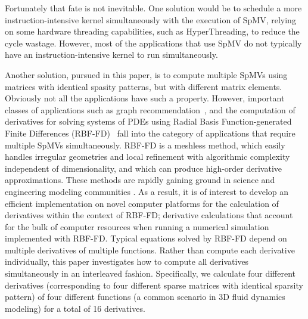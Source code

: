 \documentclass{sig-alternate}
\def\ge#1{{#1}}
\def\NOTE#1{{}}
\begin{document}
Fortunately that fate is not inevitable. One solution would be to
schedule a more instruction-intensive kernel simultaneously with the
execution of SpMV, relying on some hardware threading capabilities,
such as HyperThreading, to reduce the cycle wastage. However, most of 
the applications that use SpMV do not typically have an 
instruction-intensive kernel to run simultaneously.

Another solution, pursued in this paper, \ge{is to compute multiple SpMVs using matrices with identical spasity patterns, but with different matrix elements.}  Obviously not all the applications have such a property. However, important classes of applications such as graph recommendation~\cite{Kucuktunc13-SNAM}, \NOTE{eigensolving does not match that description} and the computation of derivatives for solving systems of PDEs using Radial Basis Function-generated Finite Differences (RBF-FD)~\cite{FLBWSC12} \ge{fall into the category of applications that require multiple SpMVs simultaneously.} RBF-FD is a meshless method, which easily handles irregular geometries and local refinement with algorithmic complexity independent of dimensionality, 
and which can produce high-order derivative approximations. These methods are rapidly gaining 
ground in science and engineering modeling communities \cite{Bayona13,CDNT,FoL11,FLBWSC12,SPLM}. 
As a result, it is of interest to develop an efficient implementation on novel computer platforms for the calculation of derivatives within the context of RBF-FD; derivative calculations that account for the bulk of computer resources when running a numerical simulation implemented with RBF-FD. 
\ge{Typical equations solved by RBF-FD depend on multiple derivatives
of multiple functions. Rather than compute each derivative individually, this paper investigates 
how to compute all derivatives simultaneously in an interleaved fashion. Specifically, 
we calculate four different derivatives (corresponding to four different sparse matrices with identical 
sparsity pattern) of four different functions
(a common scenario in 3D fluid dynamics modeling) for a total of 16 derivatives. }
\end{document}

